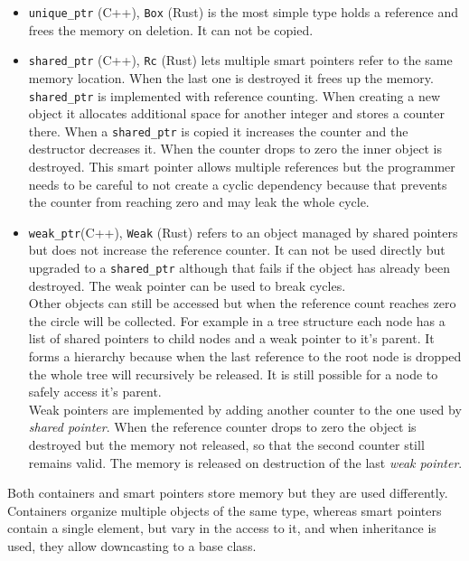 \documentclass[conference,twocolumn]{IEEEtran}
\begin{document}
\begin{itemize}
\item
\verb|unique_ptr| (C++), \verb|Box| (Rust) is the most simple type holds a reference and frees the memory on deletion. It can not be copied.

\item
\verb|shared_ptr| (C++), \verb|Rc| (Rust) lets multiple smart pointers refer to the same memory location. When the last one is destroyed it frees up the memory. \verb|shared_ptr| is implemented with reference counting. When creating a new object it allocates additional space for another integer and stores a counter there. When a \verb|shared_ptr| is copied it increases the counter and the destructor decreases it. When the counter drops to zero the inner object is destroyed. This smart pointer allows multiple references but the programmer needs to be careful to not create a cyclic dependency because that prevents the counter from reaching zero and may leak the whole cycle. 

\item \verb|weak_ptr|(C++), \verb|Weak| (Rust) refers to an object managed by shared pointers but does not increase the reference counter. It can not be used directly but upgraded to a \verb|shared_ptr| although that fails if the object has already been destroyed. The weak pointer can be used to break cycles.  \\
Other objects can still be accessed but when the reference count reaches zero the circle will be collected.
For example in a tree structure each node has a list of shared pointers to child nodes and a weak pointer to it's parent. It forms a hierarchy because when the last reference to the root node is dropped the whole tree will recursively be released. It is still possible for a node to safely access it's parent.
\\
Weak pointers are implemented by adding another counter to the one used by \emph{shared pointer}. When the reference counter drops to zero the object is destroyed but the memory not released, so that the second counter still remains valid. The memory is released on destruction of the last \emph{weak pointer}.
\end{itemize}


Both containers and smart pointers store memory but they are used differently. Containers organize multiple objects of the same type, whereas smart pointers contain a single element, but vary in the access to it, and when inheritance is used, they allow downcasting to a base class.
\end{document}
